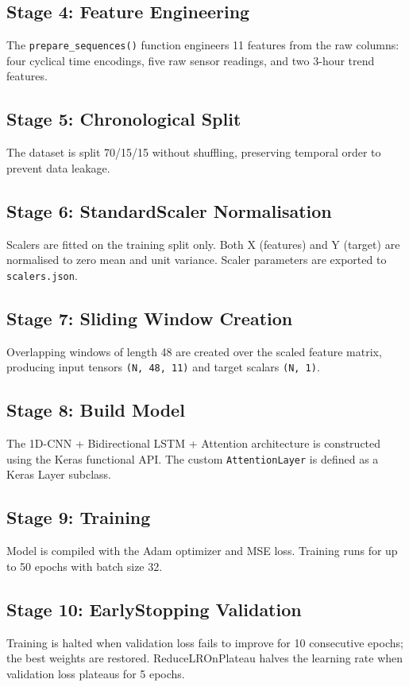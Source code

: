 \subsection{Stage 4: Feature Engineering}
The \texttt{prepare\_\allowbreak{}sequences()} function engineers 11 features from the raw columns: four cyclical time encodings, five raw sensor readings, and two 3-hour trend features.

\subsection{Stage 5: Chronological Split}
The dataset is split 70/15/15 without shuffling, preserving temporal order to prevent data leakage.

\subsection{Stage 6: StandardScaler Normalisation}
Scalers are fitted on the training split only. Both X (features) and Y (target) are normalised to zero mean and unit variance. Scaler parameters are exported to \texttt{scalers.\allowbreak{}json}.

\subsection{Stage 7: Sliding Window Creation}
Overlapping windows of length 48 are created over the scaled feature matrix, producing input tensors \texttt{(N,\allowbreak{} 48,\allowbreak{} 11)} and target scalars \texttt{(N,\allowbreak{} 1)}.

\subsection{Stage 8: Build Model}
The 1D-CNN + Bidirectional LSTM + Attention architecture is constructed using the Keras functional API. The custom \texttt{AttentionLayer} is defined as a Keras Layer subclass.

\subsection{Stage 9: Training}
Model is compiled with the Adam optimizer and MSE loss. Training runs for up to 50 epochs with batch size 32.

\subsection{Stage 10: EarlyStopping Validation}
Training is halted when validation loss fails to improve for 10 consecutive epochs; the best weights are restored. ReduceLROnPlateau halves the learning rate when validation loss plateaus for 5 epochs.

